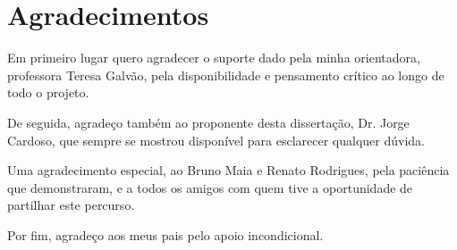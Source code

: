 \chapter*{Agradecimentos}

Em primeiro lugar quero agradecer o suporte dado pela minha orientadora, professora Teresa Galvão, pela disponibilidade e pensamento crítico ao longo de todo o projeto.

De seguida, agradeço também ao proponente desta dissertação, Dr. Jorge Cardoso, que sempre se mostrou disponível para esclarecer qualquer dúvida.

Uma agradecimento especial, ao Bruno Maia e Renato Rodrigues, pela paciência que demonstraram, e a todos os amigos com quem tive a oportunidade de partilhar este percurso.

Por fim, agradeço aos meus pais pelo apoio incondicional. 

\vspace{10mm}

